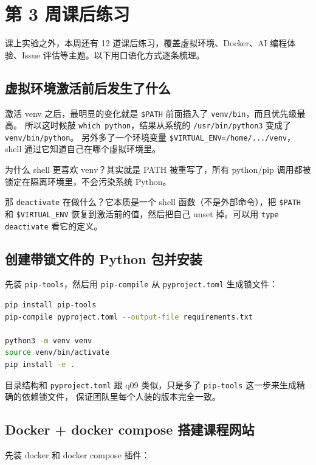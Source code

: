 \documentclass[a4paper,11pt]{ctexart}
\begin{document}
\section{第 3 周课后练习}

课上实验之外，本周还有 12 道课后练习，覆盖虚拟环境、Docker、AI 编程体验、Issue 评估等主题。以下用口语化方式逐条梳理。

\subsection{虚拟环境激活前后发生了什么}

激活 venv 之后，最明显的变化就是 \texttt{\$PATH} 前面插入了 \texttt{venv/bin}，而且优先级最高。
所以这时候敲 \texttt{which python}，结果从系统的 \texttt{/usr/bin/python3} 变成了 \texttt{venv/bin/python}。
另外多了一个环境变量 \texttt{\$VIRTUAL\_ENV=/home/.../venv}，shell 通过它知道自己在哪个虚拟环境里。

为什么 shell 更喜欢 venv？其实就是 PATH 被重写了，所有 python/pip 调用都被锁定在隔离环境里，不会污染系统 Python。

那 \texttt{deactivate} 在做什么？它本质是一个 shell 函数（不是外部命令），把 \texttt{\$PATH} 和
\texttt{\$VIRTUAL\_ENV} 恢复到激活前的值，然后把自己 unset 掉。可以用 \texttt{type deactivate} 看它的定义。

\subsection{创建带锁文件的 Python 包并安装}

先装 \texttt{pip-tools}，然后用 \texttt{pip-compile} 从 \texttt{pyproject.toml} 生成锁文件：

\begin{lstlisting}[language=bash]
pip install pip-tools
pip-compile pyproject.toml --output-file requirements.txt

python3 -m venv venv
source venv/bin/activate
pip install -e .
\end{lstlisting}

目录结构和 \texttt{pyproject.toml} 跟 q09 类似，只是多了 \texttt{pip-tools} 这一步来生成精确的依赖锁文件，
保证团队里每个人装的版本完全一致。

\subsection{Docker + docker compose 搭建课程网站}

先装 docker 和 docker compose 插件：
\end{document}
